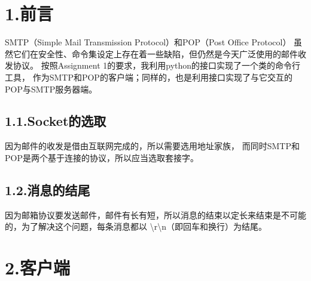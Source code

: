 \documentclass{article}
\begin{document}
{
\mdxtitleblockstart{}
\mdxauthorstart{}
\mdxauthorend\mdtitleauthorrunning{}{}\mdxtitleblockend%

\section{1.\hspace*{0.5em}前言}\label{section}%

\noindent{}SMTP（Simple Mail Transmission Protocol）和POP（Post Office Protocol）
虽然它们在安全性、命令集设定上存在着一些缺陷，但仍然是今天广泛使用的邮件收发协议。
按照Assignment 1的要求，我利用python的接口实现了一个类的命令行工具，
作为SMTP和POP的客户端；同样的，也是利用接口实现了与它交互的POP与SMTP服务器端。%

\subsection{1.1.\hspace*{0.5em}Socket的选取}\label{sec-socket}%

\noindent{}因为邮件的收发是借由互联网完成的，所以需要选用地址家族，
而同时SMTP和POP是两个基于连接的协议，所以应当选取套接字。%

\subsection{1.2.\hspace*{0.5em}消息的结尾}\label{section}%

\noindent{}因为邮箱协议要发送邮件，邮件有长有短，所以消息的结束以定长来结束是不可能的，为了解决这个问题，每条消息都以
\textbackslash{}r\textbackslash{}n（即回车和换行）为结尾。%

\section{2.\hspace*{0.5em}客户端}\label{section}%

}
\end{document}
